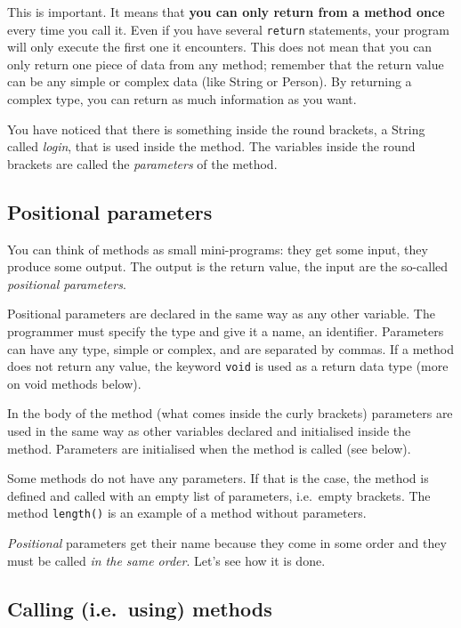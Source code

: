 This is important.
It means that \textbf{you can only return from a method once} 
every time you call it. Even if you have
several \verb+return+ statements, your program will only execute the
first one it encounters. This does not mean that you can only return
one piece of data from any method; remember that the return value can
be any simple or complex data (like String or Person). By returning a
complex type, you can return as much information as you want. 

You have noticed that there is something inside the round brackets, a
String called \emph{login}, that is used inside the method. The
variables inside the round brackets are called the \emph{parameters} of the
method. 

\subsection{Positional parameters}
\label{sec:pospar}

You can think of methods as small mini-programs: they get some input,
they produce some output. The output is the return value, the input
are the so-called \emph{positional parameters}. 

Positional parameters are declared in the same way as any other
variable. The programmer must specify the type and give it a name, an
identifier. Parameters can have any type, simple or complex, and
are separated by commas. If a method does not return any value, the
keyword \verb+void+ is used as a return data type (more on void methods
below).

In the body of the method (what comes inside the curly
brackets) parameters are used in the same way 
as other variables declared and
initialised inside the method. Parameters are initialised when the
method is called (see below). 

Some methods do not have any parameters. If that is the case, the
method is defined and called with an empty list of parameters,
i.e.~empty brackets. The method \verb+length()+ is an example of a
method without parameters. 

\emph{Positional} parameters get their name because they come in some
order and they must be called \emph{in the same order}. Let's see how
it is done. 

\subsection{Calling (i.e.~using) methods}
\label{sec:using}

